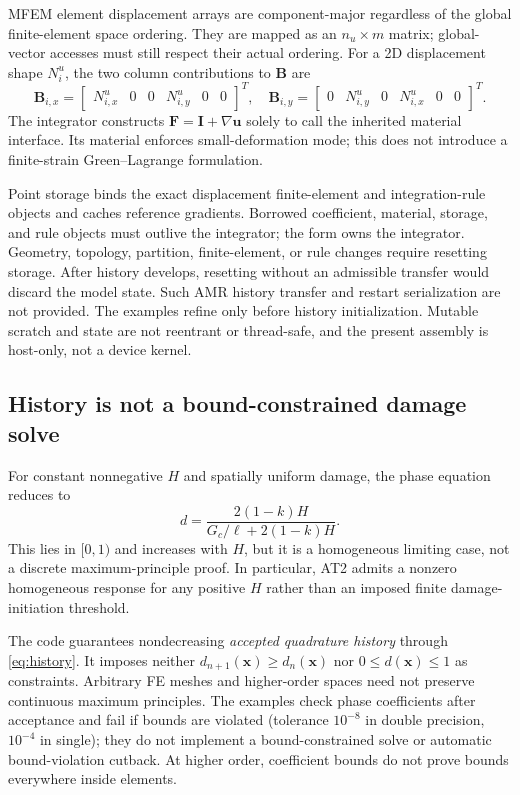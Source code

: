 \documentclass[11pt,a4paper]{article}
\newcommand{\uu}{\bm{u}}
\newcommand{\I}{\bm{I}}
\numberwithin{equation}{section}
\begin{document}
MFEM element displacement arrays are component-major regardless of the global
finite-element space ordering. They are mapped as an $n_u\times m$ matrix;
global-vector accesses must still respect their actual ordering. For a 2D
displacement shape $N_i^u$, the two column contributions to $\bm B$ are
\begin{equation}
 \bm B_{i,x}=\begin{bmatrix}N^u_{i,x}&0&0&N^u_{i,y}&0&0\end{bmatrix}^T,
 \quad
 \bm B_{i,y}=\begin{bmatrix}0&N^u_{i,y}&0&N^u_{i,x}&0&0\end{bmatrix}^T.
\end{equation}
The integrator constructs $\bm F=\I+\nabla\uu$ solely to call the inherited
material interface. Its material enforces small-deformation mode; this does
not introduce a finite-strain Green--Lagrange formulation.

Point storage binds the exact displacement finite-element and integration-rule
objects and caches reference gradients. Borrowed coefficient, material,
storage, and rule objects must outlive the integrator; the form owns the
integrator. Geometry, topology, partition, finite-element, or rule changes
require resetting storage. After history develops, resetting without an
admissible transfer would discard the model state. Such AMR history transfer
and restart serialization are not provided. The examples refine only before
history initialization. Mutable scratch and state are not reentrant or
thread-safe, and the present assembly is host-only, not a device kernel.

\subsection{History is not a bound-constrained damage solve}
For constant nonnegative $H$ and spatially uniform damage, the phase equation
reduces to
\begin{equation}
 d=\frac{2(1-k)H}{G_c/\ell+2(1-k)H}.\label{eq:uniform}
\end{equation}
This lies in $[0,1)$ and increases with $H$, but it is a homogeneous limiting
case, not a discrete maximum-principle proof. In particular, AT2 admits a
nonzero homogeneous response for any positive $H$ rather than an imposed
finite damage-initiation threshold.

The code guarantees nondecreasing \emph{accepted quadrature history} through
\eqref{eq:history}. It imposes neither $d_{n+1}(\bm x)\ge d_n(\bm x)$ nor
$0\le d(\bm x)\le1$ as constraints. Arbitrary FE meshes and higher-order
spaces need not preserve continuous maximum principles. The examples check
phase coefficients after acceptance and fail if bounds are violated (tolerance
$10^{-8}$ in double precision, $10^{-4}$ in single); they do not implement a
bound-constrained solve or automatic bound-violation cutback. At higher order,
coefficient bounds do not prove bounds everywhere inside elements.
\end{document}
